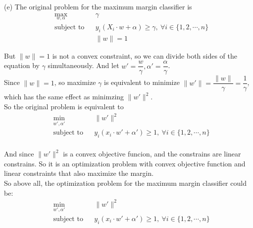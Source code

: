 \documentclass[10pt]{article}
\begin{document}
\begin{enumerate}[1.]
(e) The original problem for the maximum margin classifier is
\begin{equation}
  \begin{aligned}
    & \max_{w,\alpha}
    & & \gamma \\
    & \text{subject to}
    & & y_i(X_i\cdot w+\alpha)\geq \gamma,\ \forall i\in\{1,2,\cdots,n\} \\
    & & & \|w\|=1
  \end{aligned}
\end{equation}

But $\|w\|=1$ is not a convex constraint, so we can divide both sides of the equation by $\gamma$ simultaneously.
And let $w'=\dfrac{w}{\gamma}, \alpha'=\dfrac{\alpha}{\gamma}$.\\
Since $\|w\|=1$, so maximize $\gamma$ is equivalent to minimize $\|w'\|=\dfrac{\|w\|}{\gamma}=\dfrac{1}{\gamma}$, which has the same 
effect as minimzing $\|w'\|^2$.\\ 
So the original problem is equivalent to
\begin{equation}
  \begin{aligned}
    & \min_{w',\alpha'}
    & & \|w'\|^2 \\
    & \text{subject to}
    & & y_i(x_i\cdot w'+\alpha')\geq 1,\ \forall i\in\{1,2,\cdots,n\} \\
  \end{aligned}
\end{equation}

And since $\|w'\|^2$ is a convex objective funcion, and the constrains are linear constrains. So it is an optimization problem with convex objective function and linear constraints that also maximize the margin.\\
So above all, the optimization problem for the maximum margin classifier could be:
\begin{equation}
  \begin{aligned}
    & \min_{w',\alpha'}
    & & \|w'\|^2 \\
    & \text{subject to}
    & & y_i(x_i\cdot w'+\alpha')\geq 1,\ \forall i\in\{1,2,\cdots,n\} \\
  \end{aligned}
\end{equation}


\end{enumerate}
\end{document}

